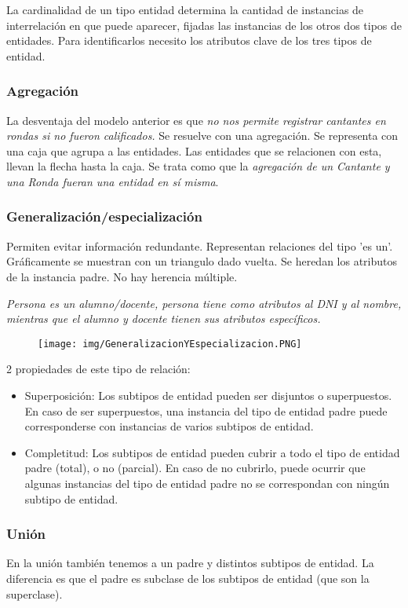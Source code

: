 La cardinalidad de un tipo entidad determina la cantidad de instancias de interrelación en que puede aparecer, fijadas las instancias de los otros dos tipos de entidades. Para identificarlos necesito los atributos clave de los tres tipos de entidad.

\subsubsection*{Agregación}
La desventaja del modelo anterior es que\textit{ no nos permite registrar cantantes en rondas si no fueron calificados.} Se resuelve con una agregación. Se representa con una caja que agrupa a las entidades. Las entidades que se relacionen con esta, llevan la flecha hasta la caja. Se trata como que la \textit{agregación de un Cantante
y una Ronda fueran una entidad en sí misma}.


\subsubsection*{Generalización/especialización}
Permiten evitar información redundante. Representan relaciones del tipo 'es un'. Gráficamente se muestran con un triangulo dado vuelta. Se heredan los atributos de la instancia padre. No hay herencia múltiple.

\textit{Persona es un alumno/docente, persona tiene como atributos al DNI y al nombre, mientras que el alumno y docente tienen sus atributos específicos.}

\begin{figure}[!htb]
    \centering
    \texttt{[image: img/GeneralizacionYEspecializacion.PNG]}
\end{figure}

2 propiedades de este tipo de relación:
\begin{itemize}
\item Superposición: Los subtipos de entidad pueden ser disjuntos o superpuestos. En caso de ser superpuestos, una instancia del tipo de entidad padre puede corresponderse con instancias de varios subtipos de entidad.
\item Completitud: Los subtipos de entidad pueden cubrir a todo el tipo de entidad padre (total), o no (parcial). En caso de no cubrirlo, puede ocurrir que algunas instancias del tipo de entidad padre no se correspondan con ningún subtipo de entidad.
\end{itemize}

\subsubsection*{Unión}
En la unión también tenemos a un padre y distintos subtipos de entidad. La diferencia es que el padre es subclase de los subtipos de entidad (que son la superclase).

